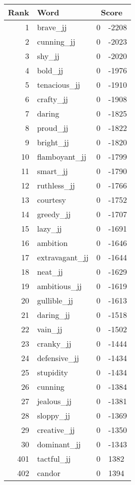 \begin{longtable}[!htbp]{| rlr@{.}l |}
    \hline
    \textbf{Rank} & \textbf{Word} & \multicolumn{2}{c|}{\textbf{Score}} \\
    \hline
    \endhead
    1 & brave\_jj & 0 & -2208 \\
    2 & cunning\_jj & 0 & -2023 \\
    3 & shy\_jj & 0 & -2020 \\
    4 & bold\_jj & 0 & -1976 \\
    5 & tenacious\_jj & 0 & -1910 \\
    6 & crafty\_jj & 0 & -1908 \\
    7 & daring & 0 & -1825 \\
    8 & proud\_jj & 0 & -1822 \\
    9 & bright\_jj & 0 & -1820 \\
    10 & flamboyant\_jj & 0 & -1799 \\
    11 & smart\_jj & 0 & -1790 \\
    12 & ruthless\_jj & 0 & -1766 \\
    13 & courtesy & 0 & -1752 \\
    14 & greedy\_jj & 0 & -1707 \\
    15 & lazy\_jj & 0 & -1691 \\
    16 & ambition & 0 & -1646 \\
    17 & extravagant\_jj & 0 & -1644 \\
    18 & neat\_jj & 0 & -1629 \\
    19 & ambitious\_jj & 0 & -1619 \\
    20 & gullible\_jj & 0 & -1613 \\
    21 & daring\_jj & 0 & -1518 \\
    22 & vain\_jj & 0 & -1502 \\
    23 & cranky\_jj & 0 & -1444 \\
    24 & defensive\_jj & 0 & -1434 \\
    25 & stupidity & 0 & -1434 \\
    26 & cunning & 0 & -1384 \\
    27 & jealous\_jj & 0 & -1381 \\
    28 & sloppy\_jj & 0 & -1369 \\
    29 & creative\_jj & 0 & -1350 \\
    30 & dominant\_jj & 0 & -1343 \\
    401 & tactful\_jj & 0 & 1382 \\
    402 & candor & 0 & 1394 \\

\end{longtable}

